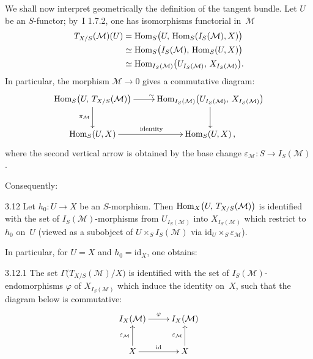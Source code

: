 We shall now interpret geometrically the definition of the tangent bundle.
{\renewcommand{\thefootnote}{(40)}}
Let \(U\) be an \(S\)-functor; by~I 1.7.2, one has isomorphisms functorial
in~\(\mathcal{M}\)
\begin{align*}
T_{X/S}(\mathcal{M})(U)
  &=\operatorname{Hom}_{S}\bigl(U,\,\operatorname{Hom}_{S}(I_{S}(\mathcal{M}),X)\bigr) \\
  &\simeq\operatorname{Hom}_{S}\bigl(I_{S}(\mathcal{M}),\,\operatorname{Hom}_{S}(U,X)\bigr) \\
  &\simeq\operatorname{Hom}_{I_{S}(\mathcal{M})}
      \bigl(U_{I_{S}(\mathcal{M})},\,X_{I_{S}(\mathcal{M})}\bigr).
\end{align*}
In particular, the morphism \(\mathcal{M}\to 0\) gives a commutative diagram:
\[
\xymatrix{
\Hom_{S}\bigl(U,\,T_{X/S}(\mathcal{M})\bigr)
  \ar[r]^{\sim}
  \ar[d]_{\pi_{\mathcal{M}}}
&
\Hom_{I_{S}(\mathcal{M})}
  \bigl(U_{I_{S}(\mathcal{M})},\,X_{I_{S}(\mathcal{M})}\bigr)
  \ar[d]
\\
\Hom_{S}(U,X)
  \ar[r]^{\textup{identity}}
&
\Hom_{S}(U,X)\,,
}
\]
where the second vertical arrow is obtained by the base change
\(\varepsilon_{\mathcal{M}}\colon S\to I_{S}(\mathcal{M})\).
{\renewcommand{\thefootnote}{(41)}}

Consequently:

\begin{proposition}{3.12}\label{II.3.12}
Let \(h_{0}\colon U\to X\) be an \(S\)-morphism. Then
\(\operatorname{Hom}_{X}\bigl(U,\,T_{X/S}(\mathcal{M})\bigr)\) is identified with the set of
\(I_{S}(\mathcal{M})\)-morphisms from \(U_{I_{S}(\mathcal{M})}\) into
\(X_{I_{S}(\mathcal{M})}\) which restrict to~\(h_{0}\) on~\(U\) (viewed as a
subobject of \(U\times_{S}I_{S}(\mathcal{M})\) via
\(\mathrm{id}_{U}\times_{S}\varepsilon_{\mathcal{M}}\)).
\end{proposition}

{\renewcommand{\thefootnote}{(42)}}
In particular, for \(U=X\) and \(h_{0}=\mathrm{id}_{X}\), one obtains:

\begin{corollary}{3.12.1}\label{II.3.12.1}
The set \(\Gamma\bigl(T_{X/S}(\mathcal{M})/X\bigr)\) is identified with the set
of \(I_{S}(\mathcal{M})\)-endomorphisms \(\varphi\) of \(X_{I_{S}(\mathcal{M})}\)
which induce the identity on~\(X\), \ie such that the diagram below is
commutative:%
{\renewcommand{\thefootnote}{(43)}}
\[
\xymatrix{
I_{X}(\mathcal{M}) \ar[r]^{\varphi}
  & I_{X}(\mathcal{M}) \\
X \ar[u]^{\varepsilon_{\mathcal{M}}} \ar[r]^{\mathrm{id}}
  & X \ar[u]^{\varepsilon_{\mathcal{M}}}
}
\]
\end{corollary}

